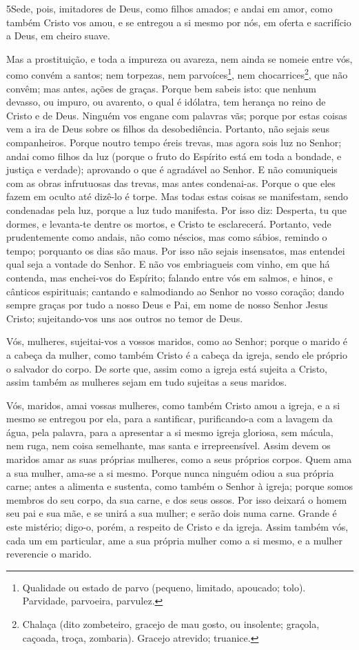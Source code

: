 \medskip

\lettrine{5} Sede, pois, imitadores de Deus, como filhos
amados; e andai em amor, como também Cristo vos amou, e se
entregou a si mesmo por nós, em oferta e sacrifício a Deus, em
cheiro suave.

Mas a prostituição, e toda a impureza ou avareza, nem ainda se
nomeie entre vós, como convém a santos; nem torpezas, nem
parvoíces\footnote{Qualidade ou estado de parvo (pequeno, limitado,
apoucado; tolo). Parvidade, parvoeira, parvulez.}, nem
chocarrices\footnote{Chalaça (dito zombeteiro, gracejo de mau gosto,
ou insolente; graçola,  caçoada, troça, zombaria). Gracejo atrevido;
truanice.}, que não convêm; mas antes, ações de graças. Porque
bem sabeis isto: que nenhum devasso, ou impuro, ou avarento, o qual
é idólatra, tem herança no reino de Cristo e de Deus. Ninguém
vos engane com palavras vãs; porque por estas coisas vem a ira de
Deus sobre os filhos da desobediência. Portanto, não sejais seus
companheiros. Porque noutro tempo éreis trevas, mas agora sois
luz no Senhor; andai como filhos da luz (porque o fruto do
Espírito está em toda a bondade, e justiça e verdade);
aprovando o que é agradável ao Senhor. E não
comuniqueis com as obras infrutuosas das trevas, mas antes
condenai-as. Porque o que eles fazem em oculto até dizê-lo é
torpe. Mas todas estas coisas se manifestam, sendo condenadas
pela luz, porque a luz tudo manifesta. Por isso diz:
Desperta, tu que dormes, e levanta-te dentre os mortos, e Cristo te
esclarecerá. Portanto, vede prudentemente como andais, não
como néscios, mas como sábios, remindo o tempo; porquanto os
dias são maus. Por isso não sejais insensatos, mas entendei
qual seja a vontade do Senhor. E não vos embriagueis com
vinho, em que há contenda, mas enchei-vos do Espírito;
falando entre vós em salmos, e hinos, e cânticos espirituais;
cantando e salmodiando ao Senhor no vosso coração; dando
sempre graças por tudo a nosso Deus e Pai, em nome de nosso Senhor
Jesus Cristo; sujeitando-vos uns aos outros no temor de Deus.

Vós, mulheres, sujeitai-vos a vossos maridos, como ao Senhor;
porque o marido é a cabeça da mulher, como também Cristo é a
cabeça da igreja, sendo ele próprio o salvador do corpo. De
sorte que, assim como a igreja está sujeita a Cristo, assim também
as mulheres sejam em tudo sujeitas a seus maridos.

Vós, maridos, amai vossas mulheres, como também Cristo amou a
igreja, e a si mesmo se entregou por ela, para a santificar,
purificando-a com a lavagem da água, pela palavra, para a
apresentar a si mesmo igreja gloriosa, sem mácula, nem ruga, nem
coisa semelhante, mas santa e irrepreensível. Assim devem os
maridos amar as suas próprias mulheres, como a seus próprios corpos.
Quem ama a sua mulher, ama-se a si mesmo. Porque nunca
ninguém odiou a sua própria carne; antes a alimenta e sustenta, como
também o Senhor à igreja; porque somos membros do seu corpo,
da sua carne, e dos seus ossos. Por isso deixará o homem seu
pai e sua mãe, e se unirá a sua mulher; e serão dois numa carne.
Grande é este mistério; digo-o, porém, a respeito de Cristo e
da igreja. Assim também vós, cada um em particular, ame a sua
própria mulher como a si mesmo, e a mulher reverencie o marido.

